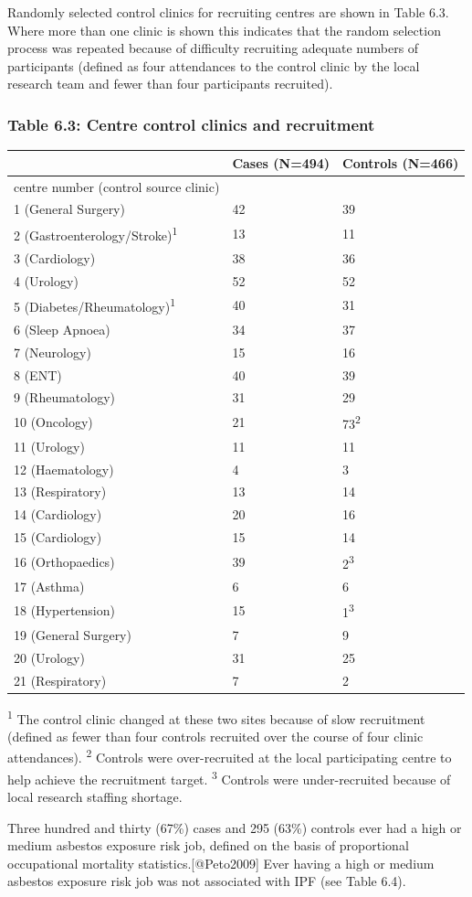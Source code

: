 Randomly selected control clinics for recruiting centres are shown in
Table 6.3. Where more than one clinic is shown this indicates that the
random selection process was repeated because of difficulty recruiting
adequate numbers of participants (defined as four attendances to the
control clinic by the local research team and fewer than four
participants recruited).

\newpage

\hypertarget{table-6.3-centre-control-clinics-and-recruitment}{%
\subsubsection{Table 6.3: Centre control clinics and
recruitment}\label{table-6.3-centre-control-clinics-and-recruitment}}

\begin{longtable}[]{@{}lll@{}}
\toprule
& Cases (N=494) & Controls (N=466)\tabularnewline
\midrule
\endhead
centre number (control source clinic) & &\tabularnewline
1 (General Surgery) & 42 & 39\tabularnewline
2 (Gastroenterology/Stroke)\textsuperscript{1} & 13 & 11\tabularnewline
3 (Cardiology) & 38 & 36\tabularnewline
4 (Urology) & 52 & 52\tabularnewline
5 (Diabetes/Rheumatology)\textsuperscript{1} & 40 & 31\tabularnewline
6 (Sleep Apnoea) & 34 & 37\tabularnewline
7 (Neurology) & 15 & 16\tabularnewline
8 (ENT) & 40 & 39\tabularnewline
9 (Rheumatology) & 31 & 29\tabularnewline
10 (Oncology) & 21 & 73\textsuperscript{2}\tabularnewline
11 (Urology) & 11 & 11\tabularnewline
12 (Haematology) & 4 & 3\tabularnewline
13 (Respiratory) & 13 & 14\tabularnewline
14 (Cardiology) & 20 & 16\tabularnewline
15 (Cardiology) & 15 & 14\tabularnewline
16 (Orthopaedics) & 39 & 2\textsuperscript{3}\tabularnewline
17 (Asthma) & 6 & 6\tabularnewline
18 (Hypertension) & 15 & 1\textsuperscript{3}\tabularnewline
19 (General Surgery) & 7 & 9\tabularnewline
20 (Urology) & 31 & 25\tabularnewline
21 (Respiratory) & 7 & 2\tabularnewline
\bottomrule
\end{longtable}

\textsuperscript{1} The control clinic changed at these two sites
because of slow recruitment (defined as fewer than four controls
recruited over the course of four clinic attendances).
\textsuperscript{2} Controls were over-recruited at the local
participating centre to help achieve the recruitment target.
\textsuperscript{3} Controls were under-recruited because of local
research staffing shortage.

Three hundred and thirty (67\%) cases and 295 (63\%) controls ever had a
high or medium asbestos exposure risk job, defined on the basis of
proportional occupational mortality statistics.{[}@Peto2009{]} Ever
having a high or medium asbestos exposure risk job was not associated
with IPF (see Table 6.4).

